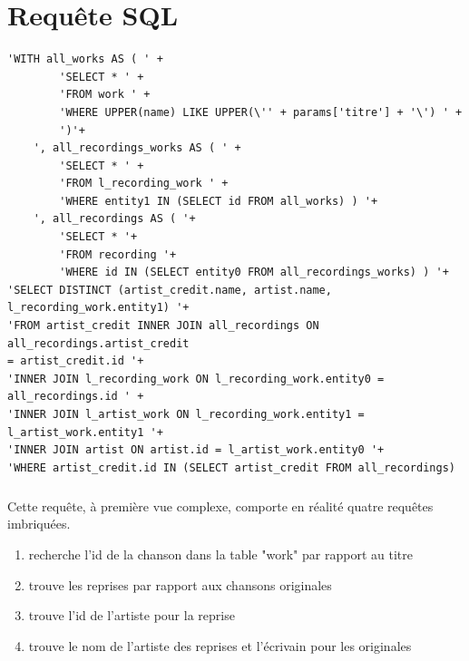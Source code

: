 \documentclass{report}
\begin{document}
%
\appendix
\chapter{Requête SQL}
\thispagestyle{fancy}
\label{requetesql}
	\begin{lstlisting}
'WITH all_works AS ( ' +
		'SELECT * ' +
		'FROM work ' +
		'WHERE UPPER(name) LIKE UPPER(\'' + params['titre'] + '\') ' +
		')'+
	', all_recordings_works AS ( ' +
		'SELECT * ' +
		'FROM l_recording_work ' +
		'WHERE entity1 IN (SELECT id FROM all_works) ) '+
	', all_recordings AS ( '+
		'SELECT * '+
		'FROM recording '+
		'WHERE id IN (SELECT entity0 FROM all_recordings_works) ) '+
'SELECT DISTINCT (artist_credit.name, artist.name, l_recording_work.entity1) '+
'FROM artist_credit INNER JOIN all_recordings ON all_recordings.artist_credit
= artist_credit.id '+
'INNER JOIN l_recording_work ON l_recording_work.entity0 = all_recordings.id ' +
'INNER JOIN l_artist_work ON l_recording_work.entity1 = l_artist_work.entity1 '+
'INNER JOIN artist ON artist.id = l_artist_work.entity0 '+
'WHERE artist_credit.id IN (SELECT artist_credit FROM all_recordings)
	\end{lstlisting}

	\paragraph{}{
		Cette requête, à première vue complexe, comporte en réalité quatre requêtes imbriquées.

		\begin{enumerate}
		    \item recherche l'id de la chanson dans la table "work" par rapport au titre
		    \item trouve les reprises par rapport aux chansons originales
		    \item trouve l'id de l'artiste pour la reprise
		    \item trouve le nom de l'artiste des reprises et l'écrivain pour les originales
		\end{enumerate}
	}
	
	
\end{document}
